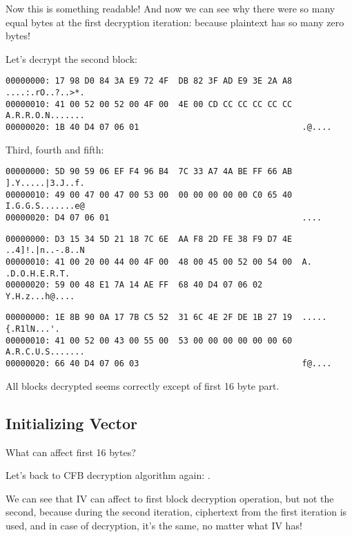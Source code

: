 Now this is something readable!
And now we can see why there were so many equal bytes at the first decryption iteration:
because plaintext has so many zero bytes!

Let's decrypt the second block:

\begin{lstlisting}
00000000: 17 98 D0 84 3A E9 72 4F  DB 82 3F AD E9 3E 2A A8  ....:.rO..?..>*.
00000010: 41 00 52 00 52 00 4F 00  4E 00 CD CC CC CC CC CC  A.R.R.O.N.......
00000020: 1B 40 D4 07 06 01                                 .@....
\end{lstlisting}

Third, fourth and fifth:

\begin{lstlisting}
00000000: 5D 90 59 06 EF F4 96 B4  7C 33 A7 4A BE FF 66 AB  ].Y.....|3.J..f.
00000010: 49 00 47 00 47 00 53 00  00 00 00 00 00 C0 65 40  I.G.G.S.......e@
00000020: D4 07 06 01                                       ....
\end{lstlisting}

\begin{lstlisting}
00000000: D3 15 34 5D 21 18 7C 6E  AA F8 2D FE 38 F9 D7 4E  ..4]!.|n..-.8..N
00000010: 41 00 20 00 44 00 4F 00  48 00 45 00 52 00 54 00  A. .D.O.H.E.R.T.
00000020: 59 00 48 E1 7A 14 AE FF  68 40 D4 07 06 02        Y.H.z...h@....
\end{lstlisting}

\begin{lstlisting}
00000000: 1E 8B 90 0A 17 7B C5 52  31 6C 4E 2F DE 1B 27 19  .....{.R1lN...'.
00000010: 41 00 52 00 43 00 55 00  53 00 00 00 00 00 00 60  A.R.C.U.S.......
00000020: 66 40 D4 07 06 03                                 f@....
\end{lstlisting}

All blocks decrypted seems correctly except of first 16 byte part.

\subsection{Initializing Vector}

What can affect first 16 bytes?

Let's back to \ac{CFB} decryption algorithm again: .

We can see that \ac{IV} can affect to first block decryption operation, but not the second,
because during the second iteration, ciphertext from the first iteration is used, and in case of decryption,
it's the same, no matter what \ac{IV} has!

